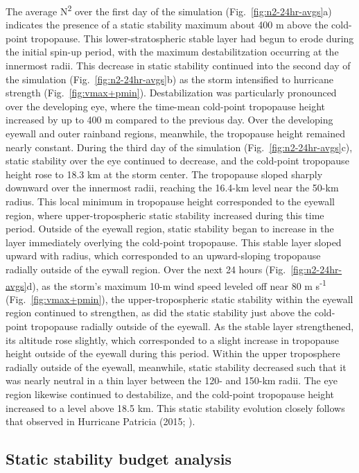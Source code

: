 \documentclass{ametsoc}
\begin{document}
The average N\textsuperscript{2} over the first day of the simulation (Fig.~\ref{fig:n2-24hr-avgs}a) indicates the presence of a static stability maximum about 400 m above the cold-point tropopause.
This lower-stratospheric stable layer had begun to erode during the initial spin-up period, with the maximum destabilitzation occurring at the innermost radii.
This decrease in static stability continued into the second day of the simulation (Fig.~\ref{fig:n2-24hr-avgs}b) as the storm intensified to hurricane strength (Fig.~\ref{fig:vmax+pmin}).
Destabilization was particularly pronounced over the developing eye, where the time-mean cold-point tropopause height increased by up to 400 m compared to the previous day.
Over the developing eyewall and outer rainband regions, meanwhile, the tropopause height remained nearly constant.
During the third day of the simulation (Fig.~\ref{fig:n2-24hr-avgs}c), static stability over the eye continued to decrease, and the cold-point tropopause height rose to 18.3 km at the storm center.
The tropopause sloped sharply downward over the innermost radii, reaching the 16.4-km level near the 50-km radius.
This local minimum in tropopause height corresponded to the eyewall region, where upper-tropospheric static stability increased during this time period.
Outside of the eyewall region, static stability began to increase in the layer immediately overlying the cold-point tropopause.
This stable layer sloped upward with radius, which corresponded to an upward-sloping tropopause radially outside of the eywall region.
Over the next 24 hours (Fig.~\ref{fig:n2-24hr-avgs}d), as the storm's maximum 10-m wind speed leveled off near 80 m s\textsuperscript{-1} (Fig.~\ref{fig:vmax+pmin}), the upper-tropospheric static stability within the eyewall region continued to strengthen, as did the static stability just above the cold-point tropopause radially outside of the eyewall.
As the stable layer strengthened, its altitude rose slightly, which corresponded to a slight increase in tropopause height outside of the eyewall during this period.
Within the upper troposphere radially outside of the eyewall, meanwhile, static stability decreased such that it was nearly neutral in a thin layer between the 120- and 150-km radii.
The eye region likewise continued to destabilize, and the cold-point tropopause height increased to a level above 18.5 km.
This static stability evolution closely follows that observed in Hurricane Patricia (2015; \citeauthor{Duran+Molinari2018} \citeyear{Duran+Molinari2018}).

 \subsection{Static stability budget analysis}
\end{document}
